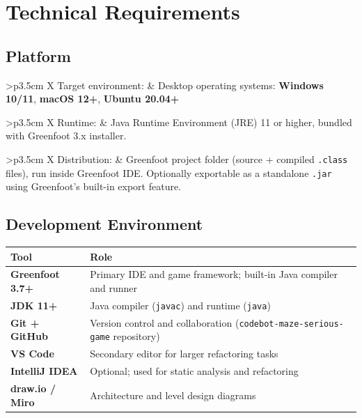 \documentclass[12pt,a4paper]{article}
\newcommand{\gddfield}[2]{%
  \noindent\begin{tabularx}{\linewidth}{>{\bfseries\color{accent}\sffamily}p{3.5cm} X}
    #1 & #2
  \end{tabularx}\smallskip}
\begin{document}
\section{Technical Requirements}

\subsection{Platform}

\begin{tcolorbox}[gddbox, title={Platform}]
\gddfield{Target environment:}{Desktop operating systems: \textbf{Windows 10/11}, \textbf{macOS 12+}, \textbf{Ubuntu 20.04+}}
\gddfield{Runtime:}{Java Runtime Environment (JRE) 11 or higher, bundled with Greenfoot 3.x installer.}
\gddfield{Distribution:}{Greenfoot project folder (source + compiled \texttt{.class} files), run inside Greenfoot IDE. Optionally exportable as a standalone \texttt{.jar} using Greenfoot's built-in export feature.}
\end{tcolorbox}

\subsection{Development Environment}

\begin{tcolorbox}[gddbox, title={Development Environment}]
\begin{tabularx}{\linewidth}{>{\bfseries\sffamily\color{primary}}p{4cm} X}
  \toprule
  Tool & Role \\
  \midrule
  \textbf{Greenfoot 3.7+}    & Primary IDE and game framework; built-in Java compiler and runner \\
  \textbf{JDK 11+}           & Java compiler (\texttt{javac}) and runtime (\texttt{java}) \\
  \textbf{Git + GitHub}      & Version control and collaboration (\texttt{codebot-maze-serious-game} repository) \\
  \textbf{VS Code}           & Secondary editor for larger refactoring tasks \\
  \textbf{IntelliJ IDEA}     & Optional; used for static analysis and refactoring \\
  \textbf{draw.io / Miro}    & Architecture and level design diagrams \\
  \bottomrule
\end{tabularx}
\end{tcolorbox}
\end{document}
